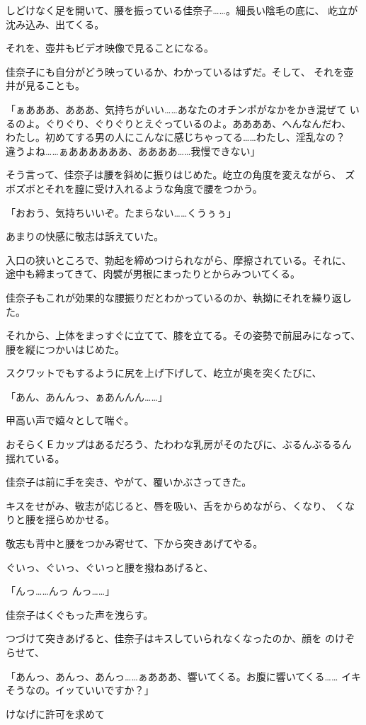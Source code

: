 ﻿\documentclass[
    book,tate,
    line_length=30zw,
    jafontsize=12pt,
    paper=b5j,
    landscape,
    ]{jlreq}
\begin{document}
しどけなく足を開いて、腰を振っている佳奈子……。細長い陰毛の底に、
屹立が沈み込み、出てくる。

それを、壺井もビデオ映像で見ることになる。

佳奈子にも自分がどう映っているか、わかっているはずだ。そして、
それを壺井が見ることも。

「ぁあああ、あああ、気持ちがいい……あなたのオチンポがなかをかき混ぜて
いるのよ。ぐりぐり、ぐりぐりとえぐっているのよ。ああああ、へんなんだわ、
わたし。初めてする男の人にこんなに感じちゃってる……わたし、淫乱なの？　
違うよね……ぁああああああ、ああああ……我慢できない」

そう言って、佳奈子は腰を斜めに振りはじめた。屹立の角度を変えながら、
ズボズボとそれを膣に受け入れるような角度で腰をつかう。

「おおう、気持ちいいぞ。たまらない……くうぅぅ」

あまりの快感に敬志は訴えていた。

入口の狭いところで、勃起を締めつけられながら、摩擦されている。それに、
途中も締まってきて、肉襞が男根にまったりとからみついてくる。

佳奈子もこれが効果的な腰振りだとわかっているのか、執拗にそれを繰り返した。

それから、上体をまっすぐに立てて、膝を立てる。その姿勢で前屈みになって、
腰を縦につかいはじめた。

スクワットでもするように尻を上げ下げして、屹立が奥を突くたびに、

「あん、あんんっ、ぁあんんん……」

甲高い声で嬉々として喘ぐ。

おそらくＥカップはあるだろう、たわわな乳房がそのたびに、ぶるんぶるるん
揺れている。

佳奈子は前に手を突き、やがて、覆いかぶさってきた。

キスをせがみ、敬志が応じると、唇を吸い、舌をからめながら、くなり、
くなりと腰を揺らめかせる。

敬志も背中と腰をつかみ寄せて、下から突きあげてやる。

ぐいっ、ぐいっ、ぐいっと腰を撥ねあげると、

「んっ……んっ んっ……」

佳奈子はくぐもった声を洩らす。

つづけて突きあげると、佳奈子はキスしていられなくなったのか、顔を
のけぞらせて、

「あんっ、あんっ、あんっ……ぁあああ、響いてくる。お腹に響いてくる……
イキそうなの。イッていいですか？」

けなげに許可を求めて
\end{document}
